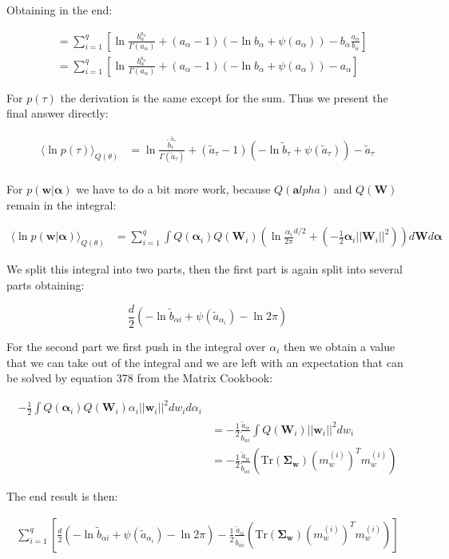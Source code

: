 \documentclass{article}
\def\*#1{\boldsymbol{#1}}
\begin{document}
Obtaining in the end:

\begin{align*}
&= \sum_{i=1}^q \left [ \ln \frac{b_\alpha^{a_\alpha}}{\Gamma(a_\alpha)} + (a_\alpha - 1)(- \ln b_\alpha + \psi(a_\alpha)) - b_\alpha \frac{a_\alpha}{b_\alpha} \right] \\
&= \sum_{i=1}^q \left [\ln \frac{b_\alpha^{a_\alpha}}{\Gamma(a_\alpha)} + (a_\alpha - 1)(- \ln b_\alpha + \psi(a_\alpha)) - a_\alpha \right ]
\end{align*}

For $p(\tau)$ the derivation is the same except for the sum. Thus we present the final answer directly:

\begin{align*}
\langle \ln p(\tau) \rangle_{Q(\theta)} &= \ln \frac{\tilde{b}_\tau^{\tilde{a}_\tau}}{\Gamma(\tilde{a}_\tau)} + (\tilde{a}_\tau - 1)(- \ln \tilde{b}_\tau + \psi(\tilde{a}_\tau)) - \tilde{a}_\tau \\
\end{align*}

For $p(\*w|\*\alpha)$ we have to do a bit more work, because $Q(\*alpha)$ and $Q(\*W)$ remain in the integral:

\begin{align*}
\langle \ln p(\*w|\*\alpha) \rangle_{Q(\theta)} &= \sum_{i = 1}^q \int Q(\*\alpha_i)Q(\*W_i)(\ln \frac{\alpha_i}{2\pi}^{d/2} + (- \frac12 \*\alpha_i ||\*W_i||^2 )) d\*W d\*\alpha
\end{align*}

We split this integral into two parts, then the first part is again split into several parts obtaining:

$$\frac{d}{2}( - \ln \tilde{b}_{\alpha i} + \psi(\tilde{a}_{\alpha_i}) - \ln 2\pi)$$

For the second part we first push in the integral over $\alpha_i$ then we obtain a value that we can take out of the integral and we are left with an expectation that can be solved by equation 378 from the Matrix Cookbook:

\begin{align*}
- \frac12 \int Q(\*\alpha_i) Q(\*W_i) \alpha_i ||\*w_i||^2 dw_i d\alpha_i \\
&= - \frac12 \frac{\tilde{a}_\alpha}{\tilde{b}_{\alpha i}} \int Q(\*W_i) ||\*w_i||^2 dw_i \\
&= - \frac12 \frac{\tilde{a}_\alpha}{\tilde{b}_{\alpha i}} (\mbox{Tr}(\*{\Sigma_w}) (m_w^{(i)})^T m_w^{(i)} )
\end{align*}

The end result is then:

\begin{align*}
\sum_{i = 1}^q \left [ \frac{d}{2}( - \ln \tilde{b}_{\alpha i} + \psi(\tilde{a}_{\alpha_i}) - \ln 2\pi) - \frac12 \frac{\tilde{a}_\alpha}{\tilde{b}_{\alpha i}} (\mbox{Tr}(\*{\Sigma_w}) (m_w^{(i)})^T m_w^{(i)} ) \right ]
\end{align*}
\end{document}
